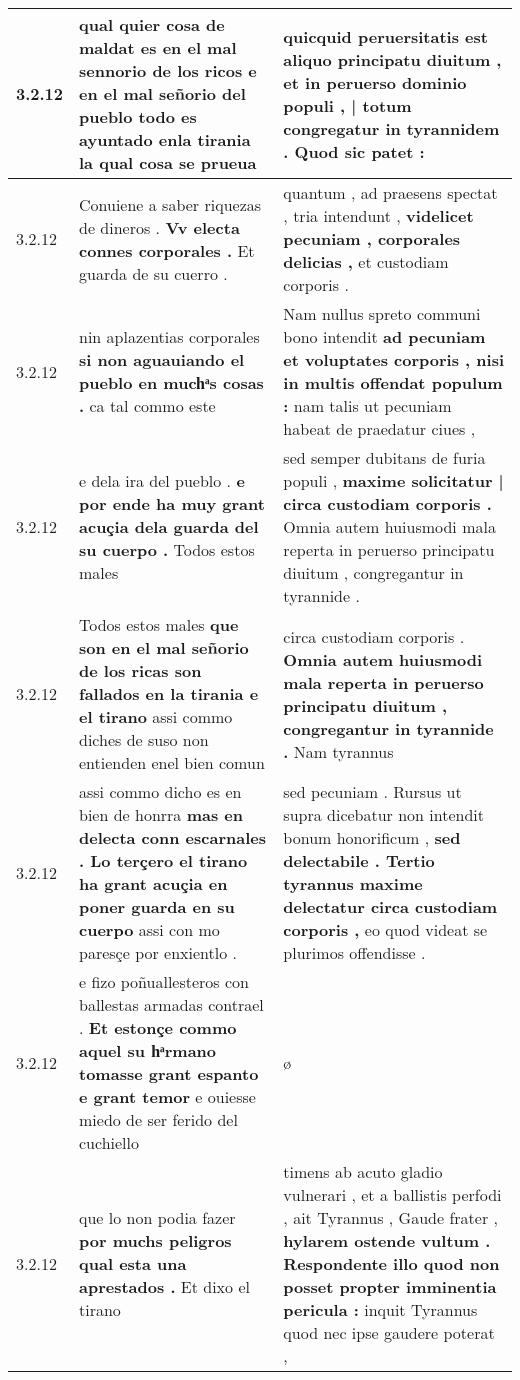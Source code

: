 \begin{tabular}{|p{1cm}|p{6.5cm}|p{6.5cm}|}
3.2.12 & qual quier cosa de maldat es en el mal sennorio de los ricos \textbf{ e en el mal señorio del pueblo todo es ayuntado enla tirania } la qual cosa se prueua & quicquid peruersitatis est aliquo principatu diuitum , \textbf{ et in peruerso dominio populi , | totum congregatur in tyrannidem . } Quod sic patet : \\\hline
3.2.12 & Conuiene a saber riquezas de dineros . \textbf{ Vv electa connes corporales . } Et guarda de su cuerro . & quantum , ad praesens spectat , tria intendunt , \textbf{ videlicet pecuniam , corporales delicias , } et custodiam corporis . \\\hline
3.2.12 & nin aplazentias corporales \textbf{ si non aguauiando el pueblo en muchͣs cosas . } ca tal commo este & Nam nullus spreto communi bono intendit \textbf{ ad pecuniam et voluptates corporis , nisi in multis offendat populum : } nam talis ut pecuniam habeat de praedatur ciues , \\\hline
3.2.12 & e dela ira del pueblo . \textbf{ e por ende ha muy grant acuçia dela guarda del su cuerpo . } Todos estos males & sed semper dubitans de furia populi , \textbf{ maxime solicitatur | circa custodiam corporis . } Omnia autem huiusmodi mala reperta in peruerso principatu diuitum , congregantur in tyrannide . \\\hline
3.2.12 & Todos estos males \textbf{ que son en el mal señorio de los ricas son fallados en la tirania e el tirano } assi commo diches de suso non entienden enel bien comun & circa custodiam corporis . \textbf{ Omnia autem huiusmodi mala reperta in peruerso principatu diuitum , congregantur in tyrannide . } Nam tyrannus \\\hline
3.2.12 & assi commo dicho es en bien de honrra \textbf{ mas en delecta conn escarnales . Lo terçero el tirano ha grant acuçia en poner guarda en su cuerpo } assi con mo paresçe por enxientlo . & sed pecuniam . Rursus ut supra dicebatur non intendit bonum honorificum , \textbf{ sed delectabile . Tertio tyrannus maxime delectatur circa custodiam corporis , } eo quod videat se plurimos offendisse . \\\hline
3.2.12 & e fizo poñuallesteros con ballestas armadas contrael . \textbf{ Et estonçe commo aquel su hͣrmano tomasse grant espanto e grant temor } e ouiesse miedo de ser ferido del cuchiello & ø \\\hline
3.2.12 & que lo non podia fazer \textbf{ por muchs peligros qual esta una aprestados . } Et dixo el tirano & timens ab acuto gladio vulnerari , et a ballistis perfodi , ait Tyrannus , Gaude frater , \textbf{ hylarem ostende vultum . Respondente illo quod non posset propter imminentia pericula : } inquit Tyrannus quod nec ipse gaudere poterat , \\\hline

\end{tabular}
